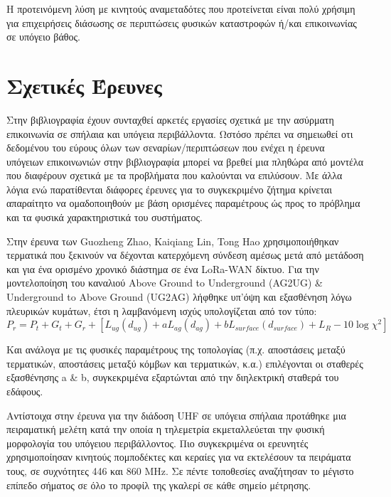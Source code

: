 \documentclass[12pt]{article}
\begin{document}
\begin{multicols*}{2}
        Η προτεινόμενη λύση με κινητούς αναμεταδότες που προτείνεται είναι πολύ χρήσιμη
        για επιχειρήσεις διάσωσης σε περιπτώσεις φυσικών καταστροφών ή/και επικοινωνίας σε
        υπόγειο βάθος.

    \section{\normalsize \textsf{Σχετικές Έρευνες}} Στην βιβλιογραφία έχουν συνταχθεί
        αρκετές εργασίες σχετικά με την ασύρματη επικοινωνία σε σπήλαια και υπόγεια
        περιβάλλοντα. Ωστόσο πρέπει να σημειωθεί οτι δεδομένου του εύρους όλων των 
        σεναρίων/περιπτώσεων που ενέχει η έρευνα υπόγειων επικοινωνιών στην βιβλιογραφία
        μπορεί να βρεθεί μια πληθώρα από μοντέλα που διαφέρουν σχετικά με τα προβλήματα που
        καλούνται να επιλύσουν. Με άλλα λόγια ενώ παρατίθενται διάφορες έρευνες για το 
        συγκεκριμένο ζήτημα κρίνεται απαραίτητο να ομαδοποιηθούν με βάση ορισμένες παραμέτρους
        ώς προς το πρόβλημα και τα φυσικά χαρακτηριστικά του συστήματος.
        
        Στην έρευνα των Guozheng Zhao, Kaiqiang Lin, Tong Hao \cite*{zhao_feasibility_2023}
        χρησιμοποιήθηκαν τερματικά που ξεκινούν να δέχονται κατερχόμενη σύνδεση αμέσως μετά 
        από μετάδοση και για ένα ορισμένο χρονικό διάστημα σε ένα LoRa-WAN δίκτυο.
        Για την μοντελοποίηση του καναλιού Above Ground to Underground (AG2UG) \& 
        Underground to Above Ground (UG2AG) λήφθηκε υπ'όψη και εξασθένηση λόγω πλευρικών
        κυμάτων, έτσι η λαμβανόμενη ισχύς υπολογίζεται από τον τύπο:\\
        \begin{equation} \label{eq:1}
            P_r = P_t + G_t + G_r + [L_{ug}(d_{ug}) + aL_{ag}(d_{ag}) + bL_{surface}(d_{surface}) + L_R - 10\log\chi^2]    
        \end{equation} 
        
        Και ανάλογα με τις φυσικές παραμέτρους της τοπολογίας (π.χ. αποστάσεις μεταξύ
        τερματικών, αποστάσεις μεταξύ κόμβων και τερματικών, κ.α.) επιλέγονται οι 
        σταθερές εξασθένησης a \& b, συγκεκριμένα εξαρτώνται από την διηλεκτρική 
        σταθερά του εδάφους.

        Αντίστοιχα στην έρευνα για την διάδοση UHF σε υπόγεια σπήλαια \cite*{rak_uhf_2007}
        προτάθηκε μια πειραματική μελέτη κατά την οποία η τηλεμετρία εκμεταλλεύεται την φυσική
        μορφολογία του υπόγειου περιβάλλοντος. Πιο συγκεκριμένα οι ερευνητές χρησιμοποίησαν
        κινητούς πομποδέκτες και κεραίες για να εκτελέσουν τα πειράματα τους, σε συχνότητες 
        446 και 860 MHz. Σε πέντε τοποθεσίες αναζήτησαν το μέγιστο επίπεδο σήματος σε όλο το
        προφίλ της γκαλερί σε κάθε σημείο μέτρησης.


\end{multicols*}
\end{document}
